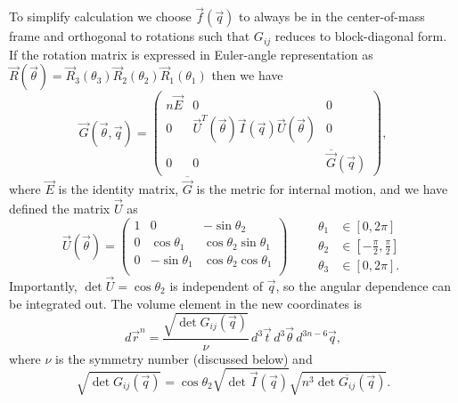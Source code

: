\documentclass[11pt,twoside]{report}
\begin{document}
To simplify calculation we choose $\vec{f}(\vec{q})$ to always be in the center-of-mass frame and orthogonal to rotations such that $G_{ij}$ reduces to block-diagonal form.
If the rotation matrix is expressed in Euler-angle representation as $\vec{R}(\vec{\theta}) = \vec{R}_3(\theta_3) \vec{R}_2(\theta_2) \vec{R}_1(\theta_1)$ then we have
\begin{equation}
  \vec{G}(\vec{\theta}, \vec{q})
  =
  \begin{pmatrix}
    n \vec{E} & 0 & 0 \\
    0 & \vec{U}^T(\vec{\theta}) \vec{I}(\vec{q}) \vec{U}(\vec{\theta}) & 0 \\
    0 & 0 & \overline{\vec{G}}(\vec{q})
  \end{pmatrix},
\end{equation}
where $\vec{E}$ is the identity matrix, $\overline{\vec{G}}$ is the metric for internal motion, and we have defined the matrix $\vec{U}$ as%
\begin{equation}
  \vec{U}(\vec{\theta})
  =
  \begin{pmatrix}
    1 &  0              & -\sin{\theta_2} \\
    0 &  \cos{\theta_1} &  \cos{\theta_2} \sin{\theta_1} \\
    0 & -\sin{\theta_1} &  \cos{\theta_2} \cos{\theta_1} \\
  \end{pmatrix}
  \qquad
  \begin{aligned}
    \theta_1 &\in [0,2\pi] \\
    \theta_2 &\in \left[-\frac{\pi}{2},\frac{\pi}{2}\right] \\
    \theta_3 &\in [0,2\pi].
  \end{aligned}
\end{equation}
Importantly, $\det{\vec{U}} = \cos{\theta_2}$ is independent of $\vec{q}$, so the angular dependence can be integrated out.
The volume element in the new coordinates is
\begin{equation}
  d\vec{r}^n
  =
  \frac{\sqrt{\det G_{ij}(\vec{q})}}{\nu}
  \, d^3 \vec{t} \, d^3 \vec{\theta} \, d^{3n-6} \vec{q},
\end{equation}
where $\nu$ is the symmetry number (discussed below) and
\begin{equation}
  \sqrt{\det G_{ij}(\vec{q})}
  =
  \cos{\theta_2} \sqrt{\det{\vec{I}(\vec{q})}}
  \sqrt{n^3 \det{\overline{G_{ij}}(\vec{q})}}.
\end{equation}
\end{document}
